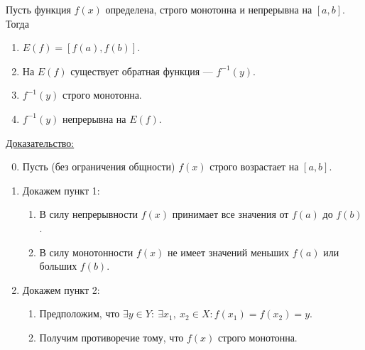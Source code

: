 \documentclass{article}
\begin{document}
\begin{theorem}
    Пусть функция \(f(x)\) определена, строго монотонна и непрерывна на \({[a, b]}\). Тогда
    \begin{enumerate}
        \item \(E(f) = \left[f(a), f(b)\right]\).
        \item На \(E(f)\) существует обратная функция --- \(f^{-1}(y)\).
        \item \(f^{-1}(y)\) строго монотонна.
        \item \(f^{-1}(y)\) непрерывна на \(E(f)\). 
    \end{enumerate}  
\end{theorem}
\noindent
\underline{Доказательство:}
\begin{enumerate}
    \setcounter{enumi}{-1}
    \item Пусть (без ограничения общности) \(f(x)\) строго возрастает на \([a, b]\).
    \item Докажем пункт 1:
    \begin{enumerate}
        \item В силу непрерывности \(f(x)\) принимает все значения от \(f(a)\) до \(f(b)\).
        \item В силу монотонности \(f(x)\) не имеет значений меньших \(f(a)\) или больших \(f(b)\).       
    \end{enumerate}
    \item Докажем пункт 2:
    \begin{enumerate}
        \item Предположим, что \(\exists y \in Y:\ \exists x_{1},\ x_{2} \in X: f(x_{1}) = f(x_{2}) = y\). 
        \item Получим противоречие тому, что \(f(x)\) строго монотонна.   
    \end{enumerate}
\end{enumerate}
\end{document}

